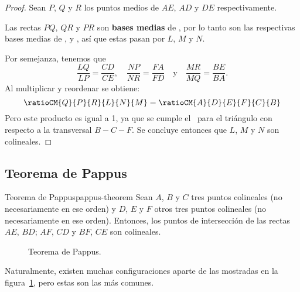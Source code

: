 \begin{proof}
    Sean $P$, $Q$ y $R$ los puntos medios de $AE$, $AD$ y $DE$ respectivamente.

    \begin{figure}[H]
        \centering
        
    \end{figure}

    Las rectas $PQ$, $QR$ y $PR$ son \textbf{bases medias} de , por lo tanto son las respectivas bases medias de ,  y , así que estas pasan por $L$, $M$ y $N$.

    Por semejanza, tenemos que
    \[
        \frac{LQ}{LP} = \frac{CD}{CE},\quad \frac{NP}{NR} = \frac{FA}{FD}\quad \text{y} \quad \frac{MR}{MQ} = \frac{BE}{BA}.
    \]
    Al multiplicar y reordenar se obtiene:
    \[
        \ratioCM{Q}{P}{R}{L}{N}{M} = \ratioCM{A}{D}{E}{F}{C}{B}
    \]
    Pero este producto es igual a 1, ya que se cumple el~ para el triángulo  con respecto a la transversal $B - C - F$.
    Se concluye entonces que $L$, $M$ y $N$ son colineales.
\end{proof}




\subsection{Teorema de Pappus}

\begin{section-theorem.tcb}{Teorema de Pappus}{pappus-theorem}
    Sean $A$, $B$ y $C$ tres puntos colineales (no necesariamente en ese orden) y $D$, $E$ y $F$ otros tres puntos colineales (no necesariamente en ese orden).
    Entonces, los puntos de intersección de las rectas $AE$, $BD$; $AF$, $CD$ y $BF$, $CE$ son colineales.
\end{section-theorem.tcb}

\begin{figure}[H]
    \centering
    
    \caption{Teorema de Pappus.}
    \label{fig:pappus-theorem}
\end{figure}

Naturalmente, existen muchas configuraciones aparte de las mostradas en la figura~\ref{fig:pappus-theorem}, pero estas son las más comunes.

